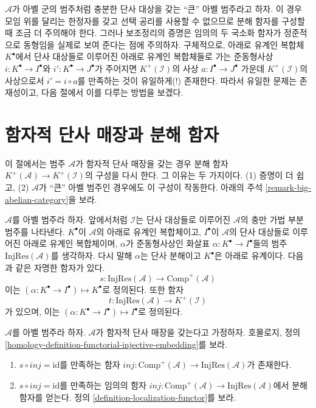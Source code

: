 \begin{remark}
\label{remark-big-localization}
$\mathcal{A}$가 아벨 군의 범주처럼 충분한 단사 대상을 갖는 ``큰''
아벨 범주라고 하자. 이 경우 모임 위를 달리는 한정자를 갖고 선택 공리를
사용할 수 없으므로 분해 함자를 구성할 때 조금 더 주의해야 한다.
그러나 보조정리의 증명은 임의의 두 국소화 함자가 정준적으로
동형임을 실제로 보여 준다는 점에 주의하자. 구체적으로, 아래로 유계인
복합체 $K^\bullet$에서 단사 대상들로 이루어진 아래로 유계인 복합체들로
가는 준동형사상 $i : K^\bullet \to I^\bullet$와
$i' : K^\bullet \to J^\bullet$가 주어지면
$K^{+}(\mathcal{I})$의 사상 $a : I^\bullet \to J^\bullet$ 가운데
$K^{+}(\mathcal{I})$의 사상으로서 $i' = i \circ a$를 만족하는 것이
유일하게(!) 존재한다.
따라서 유일한 문제는 존재성이고, 다음 절에서 이를 다루는 방법을
보겠다.
\end{remark}

\section{함자적 단사 매장과 분해 함자}
\label{section-functorial-injective-resolutions}

\noindent
이 절에서는 범주 $\mathcal{A}$가 함자적 단사 매장을 갖는 경우 분해
함자 $K^{+}(\mathcal{A}) \to K^{+}(\mathcal{I})$의 구성을 다시 한다.
그 이유는 두 가지이다. (1) 증명이 더 쉽고, (2) $\mathcal{A}$가
``큰'' 아벨 범주인 경우에도 이 구성이 작동한다. 아래의 주석
\ref{remark-big-abelian-category}을 보라.

\medskip\noindent
$\mathcal{A}$를 아벨 범주라 하자. 앞에서처럼 $\mathcal{I}$는 단사
대상들로 이루어진 $\mathcal{A}$의 충만 가법 부분범주를 나타낸다.
$K^\bullet$이 $\mathcal{A}$의 아래로 유계인 복합체이고,
$I^\bullet$이 $\mathcal{A}$의 단사 대상들로 이루어진 아래로 유계인
복합체이며, $\alpha$가 준동형사상인 화살표
$\alpha : K^\bullet \to I^\bullet$들의 범주
$\text{InjRes}(\mathcal{A})$를 생각하자. 다시 말해 $\alpha$는 단사
분해이고 $K^\bullet$은 아래로 유계이다. 다음과 같은 자명한 함자가 있다.
$$
s : \text{InjRes}(\mathcal{A}) \longrightarrow \text{Comp}^{+}(\mathcal{A})
$$
이는 $(\alpha : K^\bullet \to I^\bullet) \mapsto K^\bullet$로 정의된다.
또한 함자
$$
t : \text{InjRes}(\mathcal{A}) \longrightarrow K^{+}(\mathcal{I})
$$
가 있으며, 이는 $(\alpha : K^\bullet \to I^\bullet) \mapsto I^\bullet$로
정의된다.

\begin{lemma}
\label{lemma-functorial-injective-resolutions}
$\mathcal{A}$를 아벨 범주라 하자. $\mathcal{A}$가 함자적 단사 매장을
갖는다고 가정하자. 호몰로지, 정의
\ref{homology-definition-functorial-injective-embedding}를 보라.
\begin{enumerate}
\item $s \circ inj = \text{id}$를 만족하는 함자
$inj : \text{Comp}^{+}(\mathcal{A}) \to \text{InjRes}(\mathcal{A})$가
존재한다.
\item $s \circ inj = \text{id}$를 만족하는 임의의 함자
$inj : \text{Comp}^{+}(\mathcal{A}) \to \text{InjRes}(\mathcal{A})$에서
분해 함자를 얻는다. 정의 \ref{definition-localization-functor}를 보라.
\end{enumerate}
\end{lemma}

